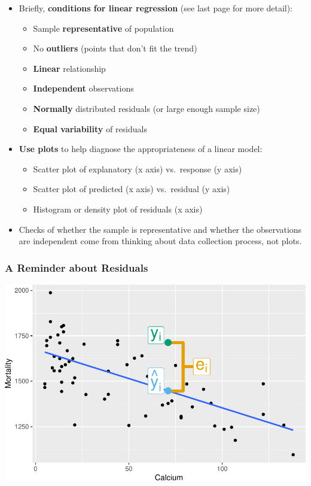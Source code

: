 \documentclass[14pt]{extarticle}
\providecommand{\tightlist}{%
  \setlength{\itemsep}{0pt}\setlength{\parskip}{0pt}}
\begin{document}
\begin{itemize}
\tightlist
\item
  Briefly, \textbf{conditions for linear regression} (see last page for
  more detail):

  \begin{itemize}
  \tightlist
  \item
    Sample \textbf{representative} of population
  \item
    No \textbf{outliers} (points that don't fit the trend)
  \item
    \textbf{Linear} relationship
  \item
    \textbf{Independent} observations
  \item
    \textbf{Normally} distributed residuals (or large enough sample
    size)
  \item
    \textbf{Equal variability} of residuals
  \end{itemize}
\item
  \textbf{Use plots} to help diagnose the appropriateness of a linear
  model:

  \begin{itemize}
  \tightlist
  \item
    Scatter plot of explanatory (x axis) vs.~response (y axis)
  \item
    Scatter plot of predicted (x axis) vs.~residual (y axis)
  \item
    Histogram or density plot of residuals (x axis)
  \end{itemize}
\item
  Checks of whether the sample is representative and whether the
  observations are independent come from thinking about data collection
  process, not plots.
\end{itemize}

\newpage

\subsubsection{A Reminder about
Residuals}\label{a-reminder-about-residuals}

\includegraphics{20181112_anscombe_residuals_files/figure-latex/unnamed-chunk-2-1.pdf}
\end{document}
